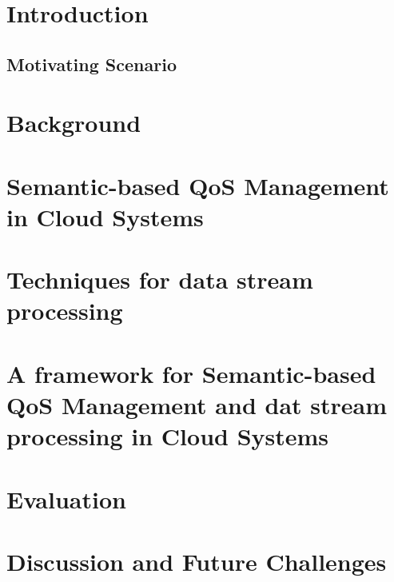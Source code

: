\documentclass[preprint,12pt]{elsarticle}
\begin{document}
\section{Introduction}

\subsection{Motivating Scenario}

\section{Background}

\section{Semantic-based QoS Management in Cloud Systems}\label{qos-semantics}

\section{Techniques for data stream processing}\label{data-stream}

\section{A framework for Semantic-based QoS Management and dat stream processing in Cloud Systems}\label{framework}

\section{Evaluation}\label{evaluation}

\section{Discussion and Future Challenges}\label{discussion}

\end{document}
